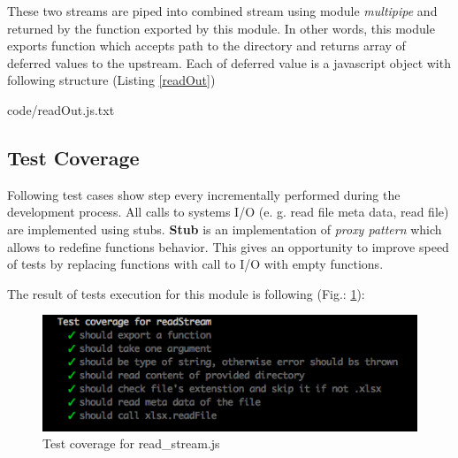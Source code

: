 These two streams are piped into combined stream using module \textit{multipipe} and returned by the function exported by this module.
In other words, this module exports function which accepts path to the directory and returns array of deferred values to the upstream. Each of deferred value  is a javascript object with following structure (Listing \ref{readOut})

{code/readOut.js.txt}

\subsection{Test Coverage}
Following test cases show step every incrementally performed during the development process. All calls to systems I/O (e. g. read file meta data, read file) are implemented using stubs. \textbf{Stub} is an implementation of \textit{proxy pattern} which allows to redefine functions behavior. This gives an opportunity to improve speed of tests by replacing functions with call to I/O with empty functions.
%

The result of tests execution  for this module is following (Fig.: \ref{fig:testRead}):
\begin{figure}[H]
	\centering
	\includegraphics[width=\linewidth]{grafiken/testReadStream.png}
	\caption{Test coverage for read\_stream.js}
	\label{fig:testRead}
\end{figure}



